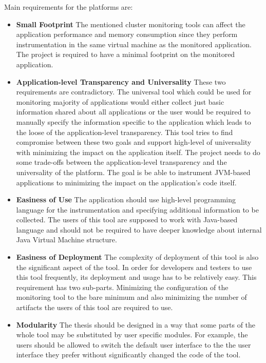 Main requirements for the platforms are:
\begin{itemize}
	\item \textbf{Small Footprint} \newline
	 The mentioned cluster monitoring tools can affect the application performance and memory consumption since they perform instrumentation in the same virtual machine as the monitored application. The project is required to have a minimal footprint on the monitored application.
	\item \textbf{Application-level Transparency and Universality} \newline
	These two requirements are contradictory. The universal tool which could be used for monitoring majority of applications would either collect just basic information shared about all applications or the user would be required to manually specify the information specific to the application which leads to the loose of the application-level transparency. This tool tries to find compromise between these two goals and support high-level of universality with minimizing the impact on the application itself.
	The project needs to do some trade-offs between the application-level transparency and the universality of the platform. The goal is be able to instrument JVM-based applications to minimizing the impact on the application's code itself.
	\item \textbf{Easiness of Use} \newline
	The application should use high-level programming language for the instrumentation and specifying additional information to be collected. The users of this tool are supposed to work with Java-based language and should not be required to have deeper knowledge about internal Java Virtual Machine structure.
	\item \textbf{Easiness of Deployment} \newline
	The complexity of deployment of this tool is also the significant aspect of the tool. In order for developers and testers to use this tool frequently, its deployment and usage has to be relatively easy. This requirement has two sub-parts. Minimizing the configuration of the monitoring tool to the bare minimum and also minimizing the number of artifacts the users of this tool are required to use.
	\item \textbf{Modularity} \newline
	The thesis should be designed in a way that some parts of the whole tool may be substituted by user specific modules. For example, the users should be allowed to switch the default user interface to the the user interface they prefer without significantly changed the code of the tool.
\end{itemize}

